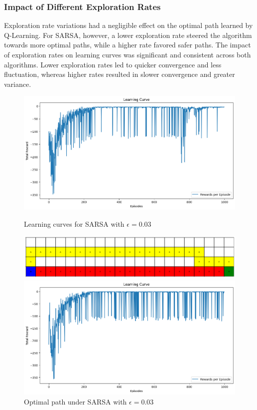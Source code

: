 \documentclass[12pt]{article}
\begin{document}
\subsubsection{Impact of Different Exploration Rates}
Exploration rate variations had a negligible effect on the optimal path learned by Q-Learning. For SARSA, however, a lower exploration rate steered the algorithm towards more optimal paths, while a higher rate favored safer paths. The impact of exploration rates on learning curves was significant and consistent across both algorithms. Lower exploration rates led to quicker convergence and less fluctuation, whereas higher rates resulted in slower convergence and greater variance.

\begin{figure}[ht]
    \centering
    \begin{minipage}[b]{0.48\textwidth}
        \centering
        \includegraphics[width=\textwidth]{image/L2.1.png}
        \caption{\scriptsize Learning curves for SARSA with \(\epsilon=0.03\)}
        \includegraphics[width=\textwidth]{image/R2.1.png}
        \caption{\scriptsize Optimal path under SARSA with \(\epsilon=0.03\)}
    \end{minipage}
    \hfill
    \begin{minipage}[b]{0.48\textwidth}
        \centering
        \includegraphics[width=\textwidth]{image/L2.3.png}

\end{minipage}
\end{figure}
\end{document}
